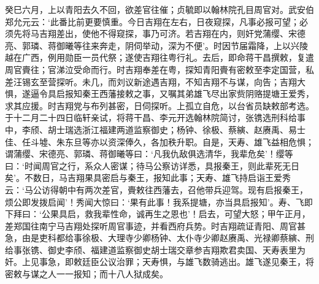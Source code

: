 \documentclass[]{article}
\begin{document}
癸巳六月，上以青阳去久不回，欲差官往催；贞毓即以翰林院孔目周官对。武安伯郑允元云：`此番比前更要慎重。今日吉翔在左右，日夜窥探，凡事必报可望；必须先将马吉翔差出，使他不得窥探，事乃可济。若吉翔在内，则奸党蒲缨、宋德亮、郭璘、蒋御曦等往来奔走，阴伺举动，深为不便'。时因节届霜降，上以兴陵越在广西，例用勋臣一员代祭；遂使吉翔往粤行礼。去后，即命蒋干昌撰敕，复遣周官賷往；官涕泣受命而行。时吉翔奉差在粤，探知青阳賷有密敕至李定国营，私差汪锡玄至营探听。未几，而刘议新途遇吉翔，不知吉翔不与谋，向告；吉翔大惧，遂逼令具启报知秦王西藩接敕之事，又嘱其弟雄飞尽出家赀阴赂提塘王爱秀，求其应援。时吉翔党与布列甚密，日伺探听。上孤立自危，以台省员缺敕部考选。于十二月二十四日临轩亲试，将蒋干昌、李元开选翰林院简讨，张镌选刑科给事中，李颀、胡士瑞选浙江福建两道监察御史；杨钟、徐极、蔡縯、赵赓禹、易士佳、任斗墟、朱东旦等亦以资深俸久，各加秩升职。自是，天寿、雄飞益相危惧；谓蒲缨、宋德亮、郭璘、蒋御曦等曰：`凡我仇敌俱选清华，我辈危矣'！缨等曰：`时闻周官之行，系众人密谋；待马公察访详悉，具报秦王，则此辈死无日矣'。不数日，马吉翔果具密启与秦王，报知此事；天寿、雄飞持启诣王爱秀云：`马公访得朝中有两次差官，賷敕往西藩去，召他带兵迎驾。现有启报秦王，烦公即发拨启闻'！秀闻大惊曰：`果有此事！我系提塘，亦当具启报知'。寿、飞即下拜曰：`公果具启，救我辈性命，诚再生之恩也'！启去，可望大怒；甲午正月，差郑国往南宁马吉翔处探听周官事迹，并看西府兵势。时吉翔疏证青阳、周官甚急，由是吏科都给事徐极、大理寺少卿杨钟、太仆寺少卿赵赓禹、光禄卿蔡縯、刑给事张镌、御史李颀、福建道监察御史胡士瑞交章参吉翔欺君卖国、天寿表里为奸。上见事急，即敕廷臣公议治罪；天寿惧，与雄飞数骑逃出。雄飞遂见秦王，将密敕与谋之人一一报知；而十八人狱成矣。
\end{document}
